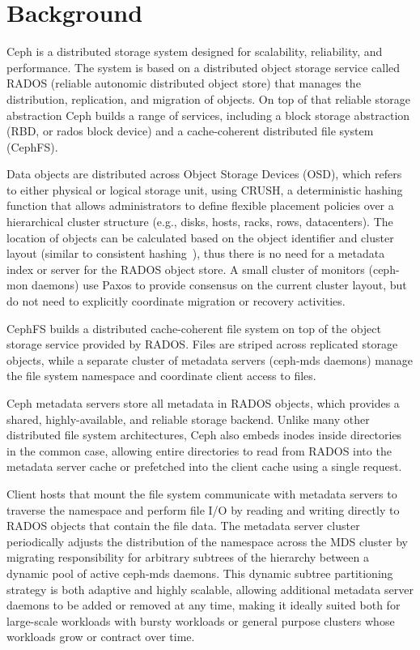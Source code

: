 \section{Background}
\label{sec:background}

Ceph\cite{Weil:2006:Ceph} is a distributed storage system designed for
scalability, reliability, and performance.  The system is based on a
distributed object storage service called RADOS (reliable autonomic distributed
object store) that manages the distribution, replication, and migration of
objects.  On top of that reliable storage abstraction Ceph builds a range of
services, including a block storage abstraction (RBD, or rados block device)
and a cache-coherent distributed file system (CephFS).

Data objects are distributed across Object Storage Devices (OSD), which refers
to either physical or logical storage unit, using CRUSH\cite{Weil:2006:Crush},
a deterministic hashing function that allows administrators to define flexible
placement policies over a hierarchical cluster structure (e.g., disks, hosts,
racks, rows, datacenters).  The location of objects can be calculated based on
the object identifier and cluster layout (similar to consistent
hashing~\cite{karger1997consistent}), thus there is no need for a metadata
index or server for the RADOS object store.
A small cluster of monitors (ceph-mon daemons) use Paxos to provide consensus
on the current cluster layout, but do not need to explicitly coordinate
migration or recovery activities.

CephFS builds a distributed cache-coherent file system on top of the object
storage service provided by RADOS.  Files are striped across replicated
storage objects, while a separate cluster of metadata servers (ceph-mds
daemons) manage the file system namespace and coordinate client access to
files.  

Ceph metadata servers store all metadata in RADOS objects, which provides a
shared, highly-available, and reliable storage backend.  Unlike many other
distributed file system architectures, Ceph also embeds inodes inside
directories in the common case, allowing entire directories to read from RADOS
into the metadata server cache or prefetched into the client cache using a
single request.

Client hosts that mount the file system communicate with metadata
servers to traverse the namespace and perform file I/O by reading and writing
directly to RADOS objects that contain the file data.  The metadata server
cluster periodically adjusts
the distribution of the namespace across the MDS cluster by migrating
responsibility for arbitrary subtrees of the hierarchy between a dynamic pool
of active ceph-mds daemons.  This dynamic subtree
partitioning~\cite{Weil:2004:dynamic} strategy is both adaptive and highly
scalable, allowing additional metadata server daemons to be added or removed
at any time, making it ideally suited both for large-scale workloads with
bursty workloads or general purpose clusters whose workloads grow or contract
over time.

